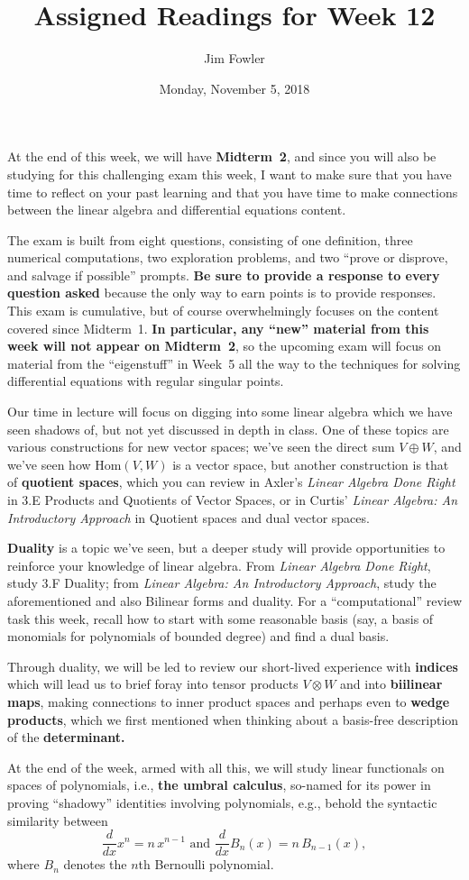 \documentclass{homework}
\author{Jim Fowler}
\title{Assigned Readings for Week 12}
\date{Monday, November 5, 2018}
\begin{document}
\maketitle

At the end of this week, we will have \textbf{Midterm~2}, and since
you will also be studying for this challenging exam this week, I want
to make sure that you have time to reflect on your past learning and
that you have time to make connections between the linear algebra and
differential equations content.

The exam is built  from eight questions, consisting of one
definition, three numerical computations, two exploration problems,
and two ``prove or disprove, and salvage if possible'' prompts.
\textbf{Be sure to provide a response to every question asked} because
the only way to earn points is to provide responses.
This exam is cumulative, but of course overwhelmingly focuses on the
content covered since Midterm~1.  \textbf{In particular, any ``new''
  material from this week will not appear on Midterm~2}, so the
upcoming exam will focus on material from the ``eigenstuff'' in Week~5
all the way to the techniques for solving differential equations with
regular singular points.

Our time in lecture will focus on digging into some linear algebra
which we have seen shadows of, but not yet discussed in depth in
class.  One of these topics are various constructions for new vector
spaces; we've seen the direct sum $V \oplus W$, and we've seen how
$\mathrm{Hom}(V,W)$ is a vector space, but another construction is
that of \textbf{quotient spaces}, which you can review in Axler's
\textit{Linear Algebra Done Right} in \textsection 3.E Products and
Quotients of Vector Spaces, or in Curtis' \textit{Linear Algebra: An
  Introductory Approach} in  Quotient spaces and dual
vector spaces.

\textbf{Duality} is a topic we've seen, but a deeper study will
provide opportunities to reinforce your knowledge of linear algebra.
From \textit{Linear Algebra Done Right}, study \textsection 3.F
Duality; from \textit{Linear Algebra: An Introductory Approach}, study
the aforementioned  and also  Bilinear
forms and duality.  For a ``computational'' review task this week,
recall how to start with some reasonable basis (say, a basis of
monomials for polynomials of bounded degree) and find a dual basis.

Through duality, we will be led to review our short-lived experience
with \textbf{indices} which will lead us to brief foray into tensor
products $V \otimes W$ and into \textbf{biilinear maps}, making
connections to inner product spaces and perhaps even to \textbf{wedge
  products}, which we first mentioned when thinking about a basis-free
description of the \textbf{determinant.}

At the end of the week, armed with all this, we will study linear
functionals on spaces of polynomials, i.e., \textbf{the umbral
  calculus}, so-named for its power in proving ``shadowy'' identities
involving polynomials, e.g., behold the syntactic similarity between
\[
 \frac {d}{dx} x^{n}=n\,x^{n-1} \mbox{ and } {\frac {d}{dx}}B_{n}(x)=n \, B_{n-1}(x),
\]
where $B_n$ denotes the $n$th Bernoulli polynomial.
\end{document}
